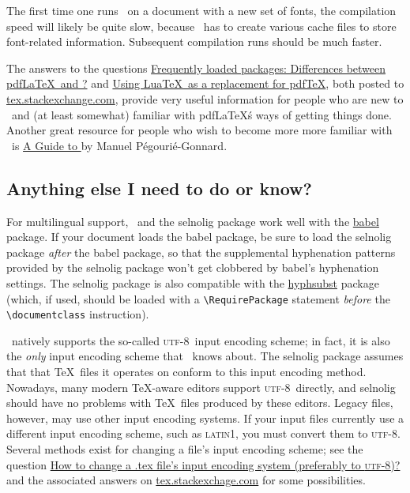 \documentclass[11pt]{article}
\newcommand{\pkg}[1]{\textsf{#1}}
\newcommand\utf{\textsc{utf-8}}
\begin{document}
The first time one runs \LuaLaTeX\ on a document with a new set of fonts, the compilation speed will likely be quite slow, because \LuaLaTeX\ has to create various cache files to store font-related information. Subsequent compilation runs should be much faster. 

The answers to the questions \href{http://tex.stackexchange.com/q/28642/5001}{Frequently loaded packages: Differences between pdf\LaTeX\ and \LuaLaTeX?} and \href{http://tex.stackexchange.com/q/32295/5001}{Using Lua\TeX\ as a replacement for pdf\TeX}, both posted to \href{http://tex.stackexchange.com/}{tex.stackexchange.com}, provide very useful information for people who are new to \LuaLaTeX\ and (at least somewhat) familiar with pdf\LaTeX\'s ways of getting things done. Another great resource for people who wish to become more more familiar with \LuaLaTeX\ is \href{http://mirror.ctan.org/info/luatex/lualatex-doc/lualatex-doc.pdf}{A Guide to \LuaLaTeX} by Manuel Pégourié-Gonnard.


\subsection{Anything else I need to do or know?} \label{sec:anythingelse}

For multilingual support, \LuaLaTeX\ and the \pkg{selnolig} package work well with the \href{http://www.ctan.org/pkg/babel}{\pkg{babel}} package. If your document loads the \pkg{babel} package, be sure to load the \pkg{selnolig} package \emph{after} the \pkg{babel} package, so that the supplemental hyphenation patterns provided by the \pkg{selnolig} package won't get clobbered by \pkg{babel}'s hyphenation settings. The \pkg{selnolig} package is also compatible with the \href{http://www.ctan.org/pkg/hyphsubst}{\pkg{hyphsubst}} package (which, if used, should be loaded with a \Verb+\RequirePackage+ statement \emph{before} the \Verb+\documentclass+ instruction).

\LuaLaTeX\ natively supports the so-called \utf\ input encoding scheme; in fact, it is also the \emph{only} input encoding scheme that \LuaLaTeX\ knows about. The \pkg{selnolig} package assumes that that \TeX\ files it operates on conform to this input encoding method. Nowadays, many modern \TeX-aware editors support \utf\ directly, and \pkg{selnolig} should have no problems with \TeX\ files produced by these editors. Legacy files, however, may use other input encoding systems. If your input files currently use a different input encoding scheme, such as \textsc{latin1}, you must convert them to \utf. Several methods exist for changing a file's input encoding scheme; see the question \href{http://tex.stackexchange.com/q/87406/5001}{How to change a .tex file's input encoding system (preferably to \utf)?} and the associated answers on \url{tex.stackexchage.com} for some possibilities.
\end{document}
